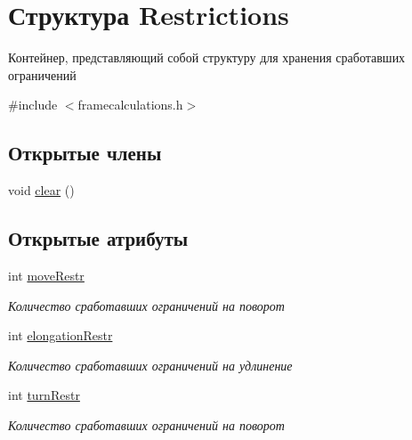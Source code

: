 \hypertarget{struct_restrictions}{}\section{Структура Restrictions}
\label{struct_restrictions}


Контейнер, представляющий собой структуру для хранения сработавших ограничений  




{\ttfamily \#include $<$framecalculations.\+h$>$}

\subsection*{Открытые члены}
\begin{DoxyCompactItemize}
\item 
void \mbox{\hyperlink{struct_restrictions_a61c2ebef361f0348d78d67e2a5b342fa}{clear}} ()
\end{DoxyCompactItemize}
\subsection*{Открытые атрибуты}
\begin{DoxyCompactItemize}
\item 
\mbox{\label{struct_restrictions_a4da33ae15353065e4eb436927f287f08}} 
int \mbox{\hyperlink{struct_restrictions_a4da33ae15353065e4eb436927f287f08}{move\+Restr}}
\begin{DoxyCompactList}\small\item\em Количество сработавших ограничений на поворот \end{DoxyCompactList}\item 
\mbox{\label{struct_restrictions_a5fe842135211f7d3748d1fbd7543c92e}} 
int \mbox{\hyperlink{struct_restrictions_a5fe842135211f7d3748d1fbd7543c92e}{elongation\+Restr}}
\begin{DoxyCompactList}\small\item\em Количество сработавших ограничений на удлинение \end{DoxyCompactList}\item 
\mbox{\label{struct_restrictions_a95bdbbec7874f5616ab95bd3e4776d20}} 
int \mbox{\hyperlink{struct_restrictions_a95bdbbec7874f5616ab95bd3e4776d20}{turn\+Restr}}
\begin{DoxyCompactList}\small\item\em Количество сработавших ограничений на поворот \end{DoxyCompactList}\end{DoxyCompactItemize}


